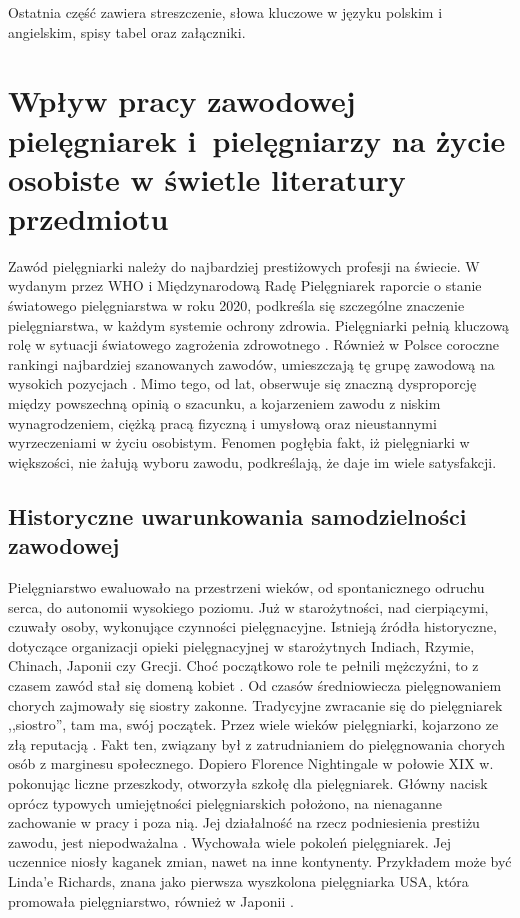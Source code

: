\documentclass[a4paper,12pt,twoside,openright]{mwrep}
\begin{document}
Ostatnia część zawiera streszczenie, słowa kluczowe w języku polskim i angielskim, spisy tabel oraz załączniki.




\chapter{Wpływ pracy zawodowej pielęgniarek i~pielęgniarzy na życie osobiste w świetle literatury przedmiotu}
Zawód pielęgniarki należy do najbardziej prestiżowych profesji na świecie. W wydanym przez WHO i Międzynarodową Radę Pielęgniarek raporcie o stanie światowego pielęgniarstwa w roku 2020, podkreśla się szczególne znaczenie pielęgniarstwa, w każdym systemie ochrony zdrowia. Pielęgniarki pełnią kluczową rolę w sytuacji światowego zagrożenia zdrowotnego \cite{who}.  Również w Polsce coroczne rankingi najbardziej szanowanych zawodów, umieszczają tę grupę zawodową na wysokich pozycjach \cite{rap}. Mimo tego, od lat, obserwuje się znaczną dysproporcję między powszechną opinią o szacunku, a kojarzeniem zawodu z niskim wynagrodzeniem, ciężką pracą fizyczną i umysłową oraz nieustannymi wyrzeczeniami w życiu osobistym. Fenomen pogłębia fakt, iż pielęgniarki w większości, nie żałują wyboru zawodu, podkreślają, że daje  im wiele satysfakcji.

\section{Historyczne uwarunkowania samodzielności zawodowej}
Pielęgniarstwo ewaluowało na przestrzeni wieków, od spontanicznego odruchu serca, do autonomii wysokiego poziomu. Już w starożytności, nad cierpiącymi, czuwały osoby, wykonujące czynności pielęgnacyjne. Istnieją źródła historyczne, dotyczące organizacji opieki pielęgnacyjnej w starożytnych Indiach, Rzymie, Chinach, Japonii czy Grecji. Choć początkowo role te pełnili mężczyźni, to z czasem zawód stał się domeną kobiet \cite{zro}. Od czasów średniowiecza pielęgnowaniem chorych zajmowały się siostry zakonne. Tradycyjne zwracanie się do pielęgniarek ,,siostro”, tam ma, swój początek. Przez wiele wieków pielęgniarki, kojarzono ze złą reputacją \cite{tlo}. Fakt ten, związany był z zatrudnianiem do pielęgnowania chorych  osób z marginesu społecznego. Dopiero Florence Nightingale w połowie XIX w. pokonując liczne przeszkody, otworzyła szkołę dla pielęgniarek. Główny nacisk oprócz typowych umiejętności pielęgniarskich położono, na nienaganne zachowanie w pracy i poza nią. Jej działalność na rzecz podniesienia prestiżu zawodu, jest niepodważalna  \cite{flo}. Wychowała wiele pokoleń pielęgniarek. Jej uczennice niosły kaganek zmian, nawet na inne kontynenty. Przykładem może być Linda'e Richards, znana jako pierwsza wyszkolona pielęgniarka USA, która promowała pielęgniarstwo, również w Japonii \cite{linda}.
\end{document}
